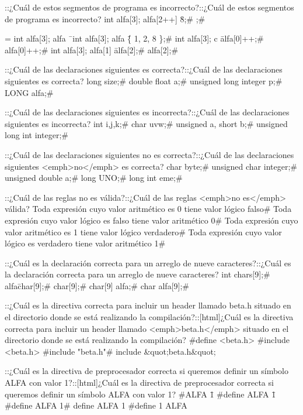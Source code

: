 {{{{{{{{{{{{{{{\question ::¿Cuál de estos segmentos de programa es incorrecto?::¿Cuál de estos segmentos de programa es incorrecto?
\choice int alfa[3]; alfa[2++] \= 8;# 
;# 

\question 	= int alfa[3]; alfa \= \
\correctchoice int alfa[3]; alfa \= \{ 1, 2, 8 \};# 
\choice int alfa[3]; c \= alfa[0]++;# 
\correctchoice alfa[0]++;# 
\choice int alfa[3]; alfa[1] \= alfa[2];# 
\correctchoice alfa[2];# 

\question ::¿Cuál de las declaraciones siguientes es correcta?::¿Cuál de las declaraciones siguientes es correcta?
\correctchoice long size;# 
\choice double float a;# 
\choice unsigned long integer p;# 
\choice LONG alfa;# 

\question ::¿Cuál de las declaraciones siguientes es incorrecta?::¿Cuál de las declaraciones siguientes es incorrecta?
\choice int i,j,k;# 
\choice char uvw;# 
\correctchoice unsigned a, short b;# 
\choice unsigned long int integer;# 

\question ::¿Cuál de las declaraciones siguientes no es correcta?::¿Cuál de las declaraciones siguientes <emph>no</emph> es correcta?
\choice char byte;# 
\choice unsigned char integer;# 
\correctchoice unsigned double a;# 
\choice long UNO;# 
\choice long int eme;# 

\question ::¿Cuál de las reglas no es válida?::¿Cuál de las reglas <emph>no es</emph> válida?
\choice Toda expresión cuyo valor aritmético es 0 tiene valor lógico falso# 
\choice Toda expresión cuyo valor lógico es falso tiene valor aritmético 0# 
\choice Toda expresión cuyo valor aritmético es 1 tiene valor lógico verdadero# 
\correctchoice Toda expresión cuyo valor lógico es verdadero tiene valor aritmético 1# 

\question ::¿Cuál es la declaración correcta para un arreglo de nueve caracteres?::¿Cuál es la declaración correcta para un arreglo de nueve caracteres?
\choice int chars[9];# 
\choice alfa\=char[9];# 
\correctchoice char[9];# 
\choice char[9] alfa;# 
\correctchoice char alfa[9];# 

\question ::¿Cuál es la directiva correcta para incluir un header llamado beta.h situado en el directorio donde se está realizando la compilación?::[html]¿Cuál es la directiva correcta para incluir un header llamado <emph>beta.h</emph> situado en el directorio donde se está realizando la compilación?
\choice \#define <beta.h>
\choice \#include <beta.h>
\correctchoice \#include "beta.h"# include &quot;beta.h&quot;

\question ::¿Cuál es la directiva de preprocesador correcta si queremos definir un símbolo ALFA con valor 1?::[html]¿Cuál es la directiva de preprocesador correcta si queremos definir un símbolo ALFA con valor 1?
\choice \#ALFA \= 1
\choice \#define ALFA \= 1
\correctchoice 1
\correctchoice \#define ALFA 1# define ALFA 1
\choice \#define 1 ALFA

}}}}}}}}}}}}}}}

